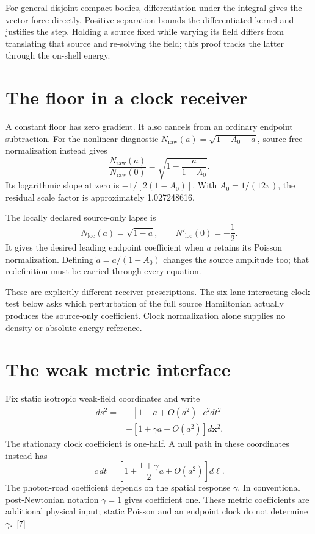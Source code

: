 \documentclass[10pt,twocolumn,letterpaper]{article}
\begin{document}
For general disjoint compact bodies, differentiation under the integral gives the vector force directly. Positive separation bounds the differentiated kernel and justifies the step. Holding a source fixed while varying its field differs from translating that source and re-solving the field; this proof tracks the latter through the on-shell energy.

\section{The floor in a clock receiver}
A constant floor has zero gradient. It also cancels from an ordinary endpoint subtraction. For the nonlinear diagnostic $N_{\mathrm{raw}}(a)=\sqrt{1-A_0-a}$, source-free normalization instead gives
\[
\frac{N_{\mathrm{raw}}(a)}{N_{\mathrm{raw}}(0)}=\sqrt{1-\frac{a}{1-A_0}}.
\]
Its logarithmic slope at zero is $-1/[2(1-A_0)]$. With $A_0=1/(12\pi)$, the residual scale factor is approximately 1.027248616.

The locally declared source-only lapse is
\[
N_{\mathrm{loc}}(a)=\sqrt{1-a},\qquad N'_{\mathrm{loc}}(0)=-\frac12.
\]
It gives the desired leading endpoint coefficient when $a$ retains its Poisson normalization. Defining $\widetilde a=a/(1-A_0)$ changes the source amplitude too; that redefinition must be carried through every equation.

These are explicitly different receiver prescriptions. The six-lane interacting-clock test below asks which perturbation of the full source Hamiltonian actually produces the source-only coefficient. Clock normalization alone supplies no density or absolute energy reference.

\section{The weak metric interface}
Fix static isotropic weak-field coordinates and write
\[
\begin{aligned}
ds^2={}&-[1-a+O(a^2)]c^2dt^2\\
&+[1+\gamma a+O(a^2)]d\mathbf x^2.
\end{aligned}
\]
The stationary clock coefficient is one-half. A null path in these coordinates instead has
\[
c\,dt=\left[1+\frac{1+\gamma}{2}a+O(a^2)\right]d\ell.
\]
The photon-road coefficient depends on the spatial response $\gamma$. In conventional post-Newtonian notation $\gamma=1$ gives coefficient one. These metric coefficients are additional physical input; static Poisson and an endpoint clock do not determine $\gamma$.~[7]
\end{document}
